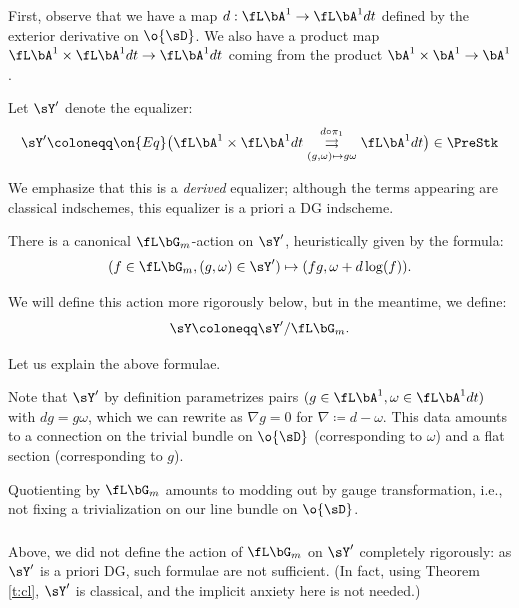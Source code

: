 First, observe that we have a map $d:\fL \bA^1 \to \fL \bA^1 dt$
defined by the exterior derivative on $\o{\sD}$.
We also have a product map $\fL \bA^1 \times \fL \bA^1 dt \to \fL \bA^1 dt$
coming from the product $\bA^1 \times \bA^1 \to \bA^1$.

Let $\sY^{\prime}$ denote the equalizer:
%
\[
\sY^{\prime} \coloneqq \on{Eq}
\big(\fL \bA^1 \times \fL \bA^1 dt
\underset{(g,\omega) \mapsto g\omega}{\overset{d\circ \pi_1}{\rightrightarrows}}
\fL \bA^1 dt\big) \in \PreStk
\]

 We emphasize that this is a \emph{derived} equalizer;
although the terms appearing are classical indschemes, this
equalizer is a priori a DG indscheme.

There is a canonical $\fL \bG_m$-action on $\sY^{\prime}$,
heuristically given by the formula:
%
\[
(f \in \fL \bG_m,(g,\omega) \in \sY^{\prime}) \mapsto
(fg,\omega+d\log(f)).
\]

 We will define this action more rigorously below,
but in the meantime, we define:
%
\[
\sY \coloneqq \sY^{\prime}/\fL \bG_m.
\]

\begin{rem}
\notready

Let us explain the above formulae.

Note that $\sY^{\prime}$ by definition parametrizes pairs
$(g \in \fL\bA^1, \omega \in \fL \bA^1 dt) $ with
$dg = g\omega$, which we can rewrite as
$\nabla g = 0$ for $\nabla \coloneqq d - \omega$.
This data amounts to a connection on the trivial bundle on $\o{\sD}$
(corresponding to $\omega$) and a flat section (corresponding to $g$).

Quotienting by $\fL \bG_m$ amounts to modding out by gauge transformation,
i.e., not fixing a trivialization on our line bundle on $\o{\sD}$.

\end{rem}

\subsubsection{}\label{ss:action-rigorous}

Above, we did not define the action of $\fL \bG_m$ on $\sY^{\prime}$
completely rigorously: as $\sY^{\prime}$ is a priori DG, such
formulae are not sufficient. (In fact, using Theorem \ref{t:cl}, $\sY^{\prime}$
is classical, and the implicit anxiety here is not needed.)

